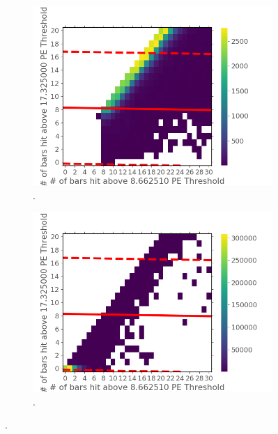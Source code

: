 \begin{figure}[htbp]
\centering
\begin{subfigure}{.5\textwidth}
  \centering
  \includegraphics[width=\linewidth]{Chapter5/Figs/Raster/Cosmic8BarSignalZoomCutSVM.png}
  \captionsetup{width=.9\linewidth}
  \caption{.}
  \label{subFig:cosmic8BarSignalZoomCutSVM}
\end{subfigure}%
\begin{subfigure}{.5\textwidth}
  \centering
\includegraphics[width=\linewidth]{Chapter5/Figs/Raster/Cosmic8BarNoiseZoomCutSVM.png}
  \captionsetup{width=.9\linewidth}
  \caption{.}
  \label{subFig:Cosmic8BarNoiseZoomCutSVM}
\end{subfigure}
\caption{.}
\label{fig:Cosmic8BarSignalNoiseZoomCutSVM}
\end{figure}

